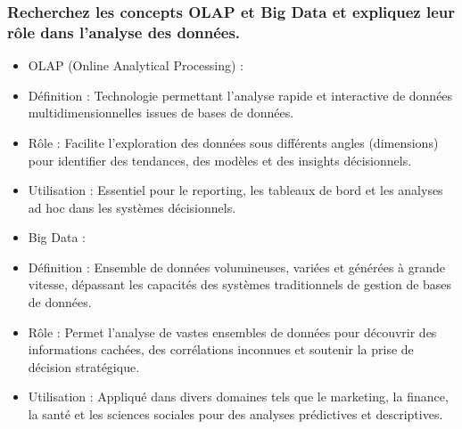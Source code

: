 \documentclass{article}
\begin{document}
\subsubsection{Recherchez les concepts OLAP et Big Data et expliquez leur rôle dans l’analyse des données.}

\begin{itemize}
  \item OLAP (Online Analytical Processing) :
  \item Définition : Technologie permettant l’analyse rapide et interactive de données multidimensionnelles issues de bases de données.
  \item Rôle : Facilite l’exploration des données sous différents angles (dimensions) pour identifier des tendances, des modèles et des insights décisionnels.
  \item Utilisation : Essentiel pour le reporting, les tableaux de bord et les analyses ad hoc dans les systèmes décisionnels.
  \item Big Data :
  \item Définition : Ensemble de données volumineuses, variées et générées à grande vitesse, dépassant les capacités des systèmes traditionnels de gestion de bases de données.
  \item Rôle : Permet l’analyse de vastes ensembles de données pour découvrir des informations cachées, des corrélations inconnues et soutenir la prise de décision stratégique.
  \item Utilisation : Appliqué dans divers domaines tels que le marketing, la finance, la santé et les sciences sociales pour des analyses prédictives et descriptives.
\end{itemize}
\end{document}
